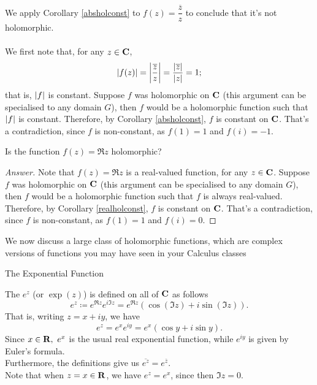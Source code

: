 
\begin{example}
We apply Corollary \ref{absholconst} to $f(z) = \dfrac{\overline{z}}{z}$ to conclude that it's not holomorphic.\\
\\
We first note that, for any $z \in \mathbf C$,
\[\left\lvert f(z)\right\rvert = \left\lvert\frac{\overline{z}}{z}\right\rvert = \frac{|\overline{z}|}{\left\lvert z\right\rvert} = 1;\]
that is, $\left\lvert f\right\rvert$ is constant. Suppose $f$ was holomorphic on $\mathbf C$ (this argument can be specialised to any domain $G$), then $f$ would be a holomorphic function such that $\left\lvert f\right\rvert$ is constant. Therefore, by Corollary \ref{absholconst}, $f$ is constant on $\mathbf C$. That's a contradiction, since $f$ is non-constant, as $f(1) = 1$ and $f(i) = -1$. 
\end{example}

\vspace*{1em}

\begin{example}[in-class]
Is the function $f(z) = \Re z$ holomorphic?
\end{example}
\begin{proof}[Answer]
Note that $f(z) = \Re z$ is a real-valued function, for any $z \in \mathbf C$. Suppose $f$ was holomorphic on $\mathbf C$ (this argument can be specialised to any domain $G$), then $f$ would be a holomorphic function such that $f$ is always real-valued. Therefore, by Corollary \ref{realholconst}, $f$ is constant on $\mathbf C$. That's a contradiction, since $f$ is non-constant, as $f(1) = 1$ and $f(i) = 0$. 
\end{proof}

\vspace*{2em}

We now discuss a large class of holomorphic functions, which are complex  versions of functions you may have seen in your Calculus classes

\vspace*{1em}

\begin{mdframed}
\begin{center}
{\Large The Exponential Function}
\end{center}
\end{mdframed}

\begin{definition}
The  $e^z$ (or $\exp(z)$) is defined on all of $\mathbf C$ as follows
\[e^z \coloneqq e^{\Re z}e^{i\Im z} = e^{\Re z}(\cos(\Im z) + i\sin(\Im z)).\]
That is, writing $z = x + iy$, we have
\[e^z = e^xe^{iy} = e^x(\cos y + i\sin y).\]
Since $x \in \mathbf R,\  e^x$ is the usual real exponential function, while $e^{iy}$ is given by Euler's formula.\\[0.5em]
Furthermore, the definitions give us $\overline{e^z} = e^{\overline{z}}$.\\[0.5em]
Note that when $z = x \in \mathbf R$, we have $e^z = e^x$, since then $\Im z = 0$.
\end{definition}

